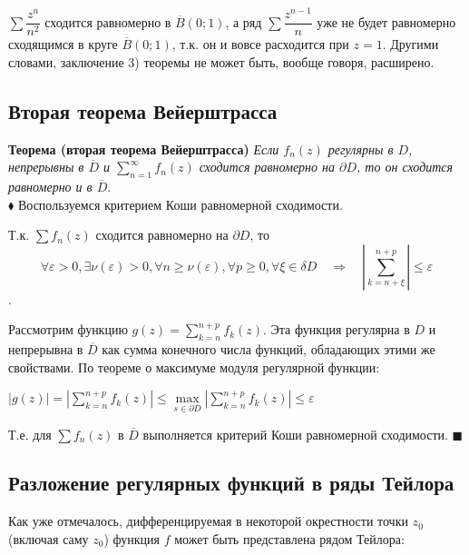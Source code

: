 \documentclass[a4paper, 12pt]{report}
\begin{document}
$\sum\dfrac{z^n}{n^2}$ сходится равномерно в $\overline{B}(0; 1)$, а ряд $\sum\dfrac{z^{n-1}}{n}$ уже не будет равномерно сходящимся в круге $\overline{B}(0; 1)$, т.к. он и вовсе расходится при $z = 1$. Другими словами, заключение 3) теоремы не может быть, вообще говоря, расширено.  



\par\bigskip
\subsection{Вторая теорема Вейерштрасса}

\textbf{Теорема (вторая теорема Вейерштрасса)} \quad
\textit{Если $f_n(z)$ регулярны в $D$, непрерывны в $\overline{D}$ и $\sum\limits_{n=1}^{\infty}f_n(z)$ сходится равномерно на $\partial D$, то он сходится равномерно и в $\overline{D}$}. \bigskip \\
$\blacklozenge$ \hspace{1 mm} Воспользуемся критерием Коши равномерной сходимости. \par Т.к. $\sum f_n(z)$ сходится равномерно на $\partial D$, то $$\forall \varepsilon > 0, \exists \nu(\varepsilon) > 0, \forall n \geq \nu(\varepsilon), \forall p \geq 0, \forall \xi \in \delta D \quad \Rightarrow \quad |\sum\limits_{k=n+\xi}^{n+p}| \leq \varepsilon$$.

Рассмотрим функцию $g(z) = \sum\limits_{k=n}^{n+p}f_k(z)$. Эта функция регулярна в $D$ и непрерывна в $\overline{D}$ как сумма конечного числа функций, обладающих этими же свойствами. По теореме о максимуме модуля регулярной функции:

\begin{center}
    $|g(z)| = |\sum\limits_{k=n}^{n+p}f_k(z)| \leq \max\limits_{s \in \partial D}|\sum\limits_{k=n}^{n+p}f_k(z)| \leq \varepsilon$
\end{center}

Т.е. для $\sum f_n(z)$ в $\overline{D}$ выполняется критерий Коши равномерной сходимости.  $\blacksquare$ 

\par\bigskip
\subsection{Разложение регулярных функций в ряды Тейлора}
\par\bigskip
Как уже отмечалось, дифференцируемая в некоторой окрестности точки $z_0$ (включая саму $z_0$) функция $f$ может быть представлена рядом Тейлора:
\end{document}
